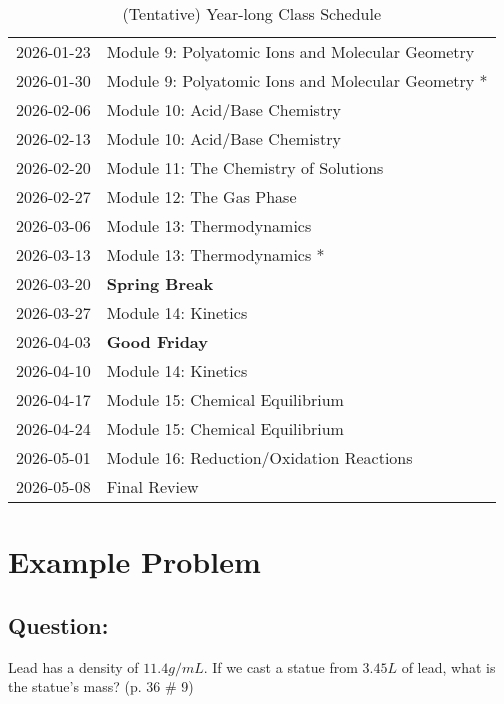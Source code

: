 \documentclass[11pt, oneside]{article}   	%
\begin{document}
\begin{table}[h]
\begin{tabular}{ l | l }
2026-01-23 & Module 9: Polyatomic Ions and Molecular Geometry \\
2026-01-30 & Module 9: Polyatomic Ions and Molecular Geometry * \\
2026-02-06 & Module 10: Acid/Base Chemistry \\
2026-02-13 & Module 10: Acid/Base Chemistry \\
2026-02-20 & Module 11: The Chemistry of Solutions \\
2026-02-27 & Module 12: The Gas Phase \\
2026-03-06 & Module 13: Thermodynamics \\
2026-03-13 & Module 13: Thermodynamics * \\
2026-03-20 & \textbf{Spring Break} \\
2026-03-27 & Module 14: Kinetics \\
2026-04-03 & \textbf{Good Friday} \\
2026-04-10 & Module 14: Kinetics \\
2026-04-17 & Module 15: Chemical Equilibrium \\
2026-04-24 & Module 15: Chemical Equilibrium \\
2026-05-01 & Module 16: Reduction/Oxidation Reactions \\
2026-05-08 & Final Review \\
\end{tabular}
\caption{(Tentative) Year-long Class Schedule}\label{table:class-schedule-year}
\end{table}

\pagebreak
\section{Example Problem}
\label{grading-example}
\subsection*{Question:} 
Lead has a density of $11.4 g/mL$. If we cast a statue from $3.45 L$ of lead, what is the statue's mass? (p. 36 \# 9)
\end{document}
